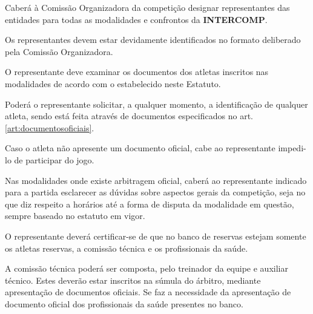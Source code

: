 \begin{article}
	Caberá à Comissão Organizadora da competição designar representantes das entidades para todas as modalidades e confrontos da \textbf{INTERCOMP}.
\end{article}

\begin{article}
	Os representantes devem estar devidamente identificados no formato deliberado pela Comissão Organizadora.
\end{article}

\begin{article}
    \label{art:representantedocumentos}
	O representante deve examinar os documentos dos atletas inscritos nas modalidades de acordo com o estabelecido neste Estatuto.

	\begin{xparagraph}
	    Poderá o representante solicitar, a qualquer momento, a identificação de qualquer atleta, sendo está feita através de documentos especificados no art. \ref{art:documentosoficiais}\ulo.
	\end{xparagraph}

	\begin{xparagraph}
	    Caso o atleta não apresente um documento oficial, cabe ao representante impedi-lo de participar do jogo.
	\end{xparagraph}
\end{article}

\begin{article}
	Nas modalidades onde existe arbitragem oficial, caberá ao representante indicado para a partida esclarecer as dúvidas sobre aspectos gerais da competição, seja no que diz respeito a horários até a forma de disputa da modalidade em questão, sempre baseado no estatuto em vigor.
\end{article}

\begin{article}
	O representante deverá certificar-se de que no banco de reservas estejam somente os atletas reservas, a comissão técnica e os profissionais da saúde.

	\begin{xparagraph}
	    A comissão técnica poderá ser composta, pelo treinador da equipe e auxiliar técnico. Estes deverão estar inscritos na súmula do árbitro, mediante apresentação de documentos oficiais. Se faz a necessidade da apresentação de documento oficial dos profissionais da saúde presentes no banco.
	\end{xparagraph}
\end{article}

